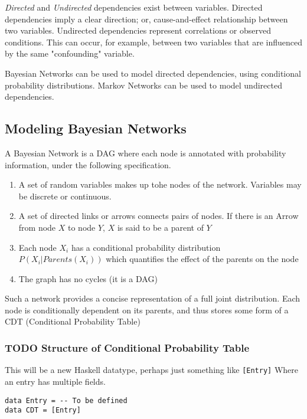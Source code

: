 \documentclass[11pt]{article}
\begin{document}
\emph{Directed} and \emph{Undirected} dependencies exist between
variables. Directed dependencies imply a clear direction; or,
cause-and-effect relationship between two variables. Undirected
dependencies represent correlations or observed conditions. This
can occur, for example, between two variables that are influenced
by the same "confounding" variable.

Bayesian Networks can be used to model directed dependencies,
using conditional probability distributions. Markov Networks can
be used to model undirected dependencies.

\subsection{Modeling Bayesian Networks}
\label{sec-2-2}

A Bayesian Network is a DAG where each node is annotated
with probability information, under the following specification.

\begin{enumerate}
\item A set of random variables makes up tohe nodes of the network. Variables
may be discrete or continuous.
\item A set of directed links or arrows connects pairs of nodes. If there is
an Arrow from node $X$ to node $Y$, $X$ is said to be a parent of $Y$
\item Each node $X_i$ has a conditional probability distribution
$P(X_i | Parents (X_i))$ which quantifies the effect of the
parents on the node
\item The graph has no cycles (it is a DAG)
\end{enumerate}

Such a network provides a concise representation of a full joint
distribution. Each node is conditionally dependent on its parents,
and thus stores some form of a CDT (Conditional Probability Table)

\subsubsection{{\bfseries\sffamily TODO} Structure of Conditional Probability Table}
\label{sec-2-2-1}
This will be a new Haskell datatype, perhaps just something like \texttt{[Entry]}
Where an entry has multiple fields.

\begin{center}
\texttt{data Entry = -{}- To be defined} \\
      \texttt{data CDT = [Entry]}
\end{center}
\end{document}
